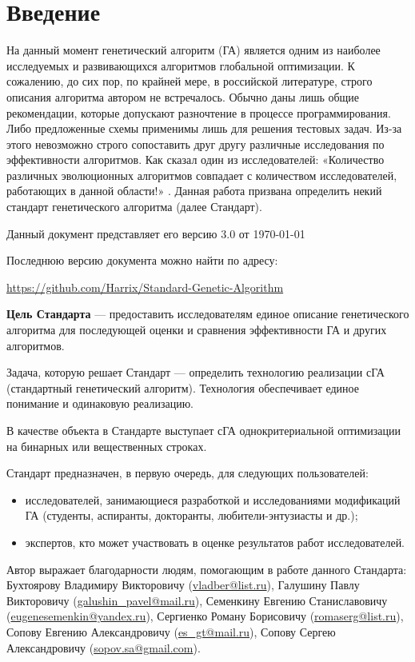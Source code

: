 \chapter*{Введение}

На данный момент генетический алгоритм (ГА) является одним из наиболее исследуемых и развивающихся алгоритмов глобальной оптимизации. К сожалению, до сих пор, по крайней мере, в российской литературе, строго описания алгоритма автором не встречалось. Обычно даны лишь общие рекомендации, которые допускают разночтение в процессе программирования. Либо предложенные схемы применимы лишь для решения тестовых задач. Из-за этого невозможно строго сопоставить друг другу различные исследования по эффективности алгоритмов. Как сказал один из исследователей: «Количество различных эволюционных алгоритмов совпадает с количеством исследователей, работающих в данной области!» \cite{web:makeingsimpleGA}. Данная работа призвана определить некий стандарт генетического алгоритма (далее Стандарт).

Данный документ представляет его версию 3.0 от \today

Последнюю версию документа можно найти по адресу:

\href{https://github.com/Harrix/Standard-Genetic-Algorithm}{https://github.com/Harrix/Standard-Genetic-Algorithm}

\textbf{Цель Стандарта} --- предоставить исследователям единое описание генетического алгоритма для последующей оценки и сравнения эффективности ГА и других алгоритмов. 

Задача, которую решает Стандарт --- определить технологию реализации сГА (стандартный генетический алгоритм). Технология обеспечивает единое понимание и одинаковую реализацию.

В качестве объекта в Стандарте выступает сГА однокритериальной оптимизации на бинарных или вещественных строках.

Стандарт предназначен, в первую очередь, для следующих пользователей:
\begin{itemize}
\item исследователей, занимающиеся  разработкой и исследованиями модификаций ГА (студенты, аспиранты, докторанты, любители-энтузиасты и др.);
\item экспертов, кто может участвовать в оценке результатов работ исследователей.
\end{itemize}


Автор выражает благодарности людям, помогающим в работе данного Стандарта: Бухтоярову Владимиру Викторовичу (\href{mailto:vladber@list.ru}{vladber@list.ru}), Галушину Павлу Викторовичу (\href{mailto:galushin\_pavel@mail.ru}{galushin\_pavel@mail.ru}), Семенкину Евгению Станиславовичу (\href{mailto:eugenesemenkin@yandex.ru}{eugenesemenkin@yandex.ru}), Сергиенко Роману Борисовичу (\href{mailto:romaserg@list.ru}{romaserg@list.ru}), Сопову Евгению Александровичу (\href{mailto:es\_gt@mail.ru}{es\_gt@mail.ru}), Сопову Сергею Александровичу (\href{mailto:sopov.sa@gmail.com}{sopov.sa@gmail.com}).

